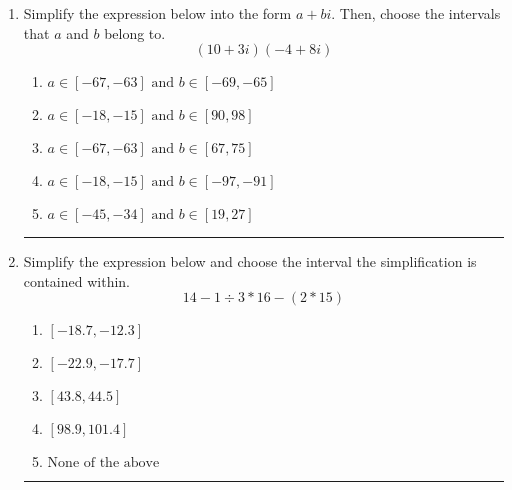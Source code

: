 \documentclass[14pt]{extbook}
\newcommand{\litem}[1]{\item#1\hspace*{-1cm}\rule{\textwidth}{0.4pt}}
\begin{document}
\begin{enumerate}
{\begin{enumerate}[label=\Alph*.]
\end{enumerate} }
\litem{
Simplify the expression below into the form $a+bi$. Then, choose the intervals that $a$ and $b$ belong to.\[ (10 + 3 i)(-4 + 8 i) \]\begin{enumerate}[label=\Alph*.]
\item \( a \in [-67, -63] \text{ and } b \in [-69, -65] \)
\item \( a \in [-18, -15] \text{ and } b \in [90, 98] \)
\item \( a \in [-67, -63] \text{ and } b \in [67, 75] \)
\item \( a \in [-18, -15] \text{ and } b \in [-97, -91] \)
\item \( a \in [-45, -34] \text{ and } b \in [19, 27] \)

\end{enumerate} }
\litem{
Simplify the expression below and choose the interval the simplification is contained within.\[ 14 - 1 \div 3 * 16 - (2 * 15) \]\begin{enumerate}[label=\Alph*.]
\item \( [-18.7, -12.3] \)
\item \( [-22.9, -17.7] \)
\item \( [43.8, 44.5] \)
\item \( [98.9, 101.4] \)
\item \( \text{None of the above} \)

\end{enumerate} }
\end{enumerate}
\end{document}
